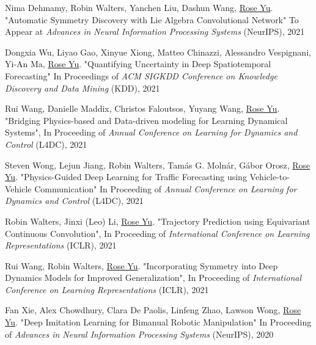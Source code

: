 \documentclass[margin,line]{res}
\begin{document}
\begin{resume}
\begin{enumerate}[label={[C\arabic*]}]
\item 
Nima Dehmamy, Robin Walters, Yanchen Liu, Dashun Wang, \underline{Rose Yu}. "Automatic Symmetry Discovery with Lie Algebra Convolutional Network"
To Appear  at \textit{Advances in Neural Information Processing Systems} (NeurIPS), 2021

\item Dongxia Wu, Liyao Gao, Xinyue Xiong, Matteo Chinazzi, Alessandro Vespignani, Yi-An Ma, \underline{Rose Yu}.
"Quantifying Uncertainty in Deep Spatiotemporal Forecasting"
In Proceedings of \textit{ACM SIGKDD Conference on Knowledge Discovery and Data Mining} (KDD), 2021

\item  Rui Wang, Danielle Maddix, Christos Faloutsos, Yuyang Wang, \underline{Rose Yu}. "Bridging Physics-based and Data-driven modeling for Learning Dynamical Systems", In Proceeding of 
\textit{Annual Conference on Learning for Dynamics and Control}
 (L4DC), 2021 


\item Steven Wong, Lejun Jiang, Robin Walters, Tam{\'{a}}s G. Moln{\'{a}}r, G{\'{a}}bor Orosz,  \underline{Rose Yu}. "Physics-Guided Deep Learning for Traffic Forecasting using Vehicle-to-Vehicle Communication" In Proceeding of  
\textit{Annual Conference on Learning for Dynamics and Control}
 (L4DC), 2021 


\item  Robin Walters, Jinxi (Leo) Li, \underline{Rose Yu}. "Trajectory Prediction using Equivariant Continuous Convolution", In Proceeding of \textit{International Conference on Learning Representations} (ICLR), 2021

\item  Rui Wang, Robin Walters, \underline{Rose Yu}.  "Incorporating Symmetry into Deep Dynamics Models for Improved Generalization", In Proceeding of  \textit{International Conference on Learning Representations} (ICLR), 2021

\item Fan Xie,  Alex  Chowdhury, Clara De Paolis, Linfeng Zhao, Lawson Wong,  \underline{Rose Yu}.
"Deep Imitation Learning for Bimanual  Robotic Manipulation"
  In Proceeding of \textit{Advances in Neural Information Processing Systems} (NeurIPS), 2020
  

\end{enumerate}
\end{resume}
\end{document}
